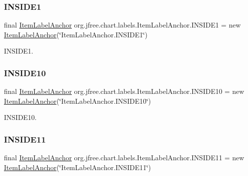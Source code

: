 \subsubsection{\texorpdfstring{I\+N\+S\+I\+D\+E1}{INSIDE1}}
{\footnotesize\ttfamily final \mbox{\hyperlink{classorg_1_1jfree_1_1chart_1_1labels_1_1_item_label_anchor}{Item\+Label\+Anchor}} org.\+jfree.\+chart.\+labels.\+Item\+Label\+Anchor.\+I\+N\+S\+I\+D\+E1 = new \mbox{\hyperlink{classorg_1_1jfree_1_1chart_1_1labels_1_1_item_label_anchor}{Item\+Label\+Anchor}}(\char`\"{}Item\+Label\+Anchor.\+I\+N\+S\+I\+D\+E1\char`\"{})\hspace{0.3cm}{\ttfamily [static]}}

I\+N\+S\+I\+D\+E1. \mbox{\label{classorg_1_1jfree_1_1chart_1_1labels_1_1_item_label_anchor_ac1c00e74b0ecf2474eda8dc9eecad4d1}} 
\subsubsection{\texorpdfstring{I\+N\+S\+I\+D\+E10}{INSIDE10}}
{\footnotesize\ttfamily final \mbox{\hyperlink{classorg_1_1jfree_1_1chart_1_1labels_1_1_item_label_anchor}{Item\+Label\+Anchor}} org.\+jfree.\+chart.\+labels.\+Item\+Label\+Anchor.\+I\+N\+S\+I\+D\+E10 = new \mbox{\hyperlink{classorg_1_1jfree_1_1chart_1_1labels_1_1_item_label_anchor}{Item\+Label\+Anchor}}(\char`\"{}Item\+Label\+Anchor.\+I\+N\+S\+I\+D\+E10\char`\"{})\hspace{0.3cm}{\ttfamily [static]}}

I\+N\+S\+I\+D\+E10. \mbox{\label{classorg_1_1jfree_1_1chart_1_1labels_1_1_item_label_anchor_a5c24cf1c009b9883ef539c451e65c96e}} 
\subsubsection{\texorpdfstring{I\+N\+S\+I\+D\+E11}{INSIDE11}}
{\footnotesize\ttfamily final \mbox{\hyperlink{classorg_1_1jfree_1_1chart_1_1labels_1_1_item_label_anchor}{Item\+Label\+Anchor}} org.\+jfree.\+chart.\+labels.\+Item\+Label\+Anchor.\+I\+N\+S\+I\+D\+E11 = new \mbox{\hyperlink{classorg_1_1jfree_1_1chart_1_1labels_1_1_item_label_anchor}{Item\+Label\+Anchor}}(\char`\"{}Item\+Label\+Anchor.\+I\+N\+S\+I\+D\+E11\char`\"{})\hspace{0.3cm}{\ttfamily [static]}}

